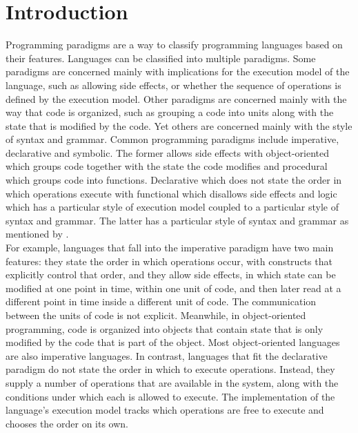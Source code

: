 \documentclass{sig-alternate}
\begin{document}
	\section{Introduction}
	Programming paradigms are a way to classify programming languages based on their features. Languages can be classified into multiple paradigms. Some paradigms are concerned mainly with implications for the execution model of the language, such as allowing side effects, or whether the sequence of operations is defined by the execution model. Other paradigms are concerned mainly with the way that code is organized, such as grouping a code into units along with the state that is modified by the code. Yet others are concerned mainly with the style of syntax and grammar. Common programming paradigms include imperative, declarative and symbolic. The former allows side effects with object-oriented which groups code together with the state the code modifies and procedural which groups code into functions. Declarative which does not state the order in which operations execute with functional which disallows side effects and logic which has a particular style of execution model coupled to a particular style of syntax and grammar. The latter has a particular style of syntax and grammar as mentioned by \cite{kurt2012,Frans2012}.\\
For example, languages that fall into the imperative paradigm have two main features: they state the order in which operations occur, with constructs that explicitly control that order, and they allow side effects, in which state can be modified at one point in time, within one unit of code, and then later read at a different point in time inside a different unit of code. The communication between the units of code is not explicit. Meanwhile, in object-oriented programming, code is organized into objects that contain state that is only modified by the code that is part of the object. Most object-oriented languages are also imperative languages. In contrast, languages that fit the declarative paradigm do not state the order in which to execute operations. Instead, they supply a number of operations that are available in the system, along with the conditions under which each is allowed to execute. The implementation of the language's execution model tracks which operations are free to execute and chooses the order on its own. \\
\end{document}
